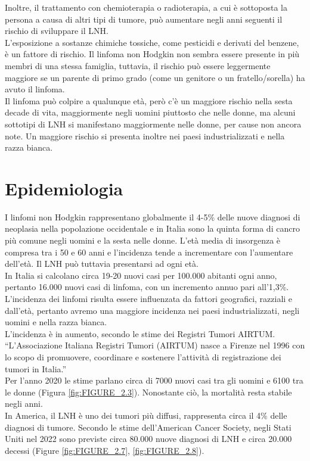 Inoltre, il trattamento con chemioterapia o radioterapia, a cui è sottoposta la persona a causa di altri tipi di tumore, 
può aumentare negli anni seguenti  il rischio di sviluppare il LNH\cite{AMERICANCS}.\\
L’esposizione a sostanze chimiche tossiche, come pesticidi e derivati del benzene, è un fattore di rischio. 
Il linfoma non Hodgkin non sembra essere presente in più membri di una stessa famiglia, tuttavia, 
il rischio può essere leggermente maggiore se un parente di primo grado (come un genitore o un fratello/sorella) 
ha avuto il linfoma\cite{AMERICANCS}.\\
Il linfoma può colpire a qualunque età, però c’è un maggiore rischio nella sesta decade di vita, 
maggiormente negli uomini piuttosto che nelle donne, ma alcuni sottotipi di LNH si manifestano 
maggiormente nelle donne, per cause non ancora note. 
Un maggiore rischio si presenta inoltre nei paesi industrializzati e nella razza bianca\cite{AMERICANCS}.\\ 

\section{Epidemiologia}
I linfomi non Hodgkin rappresentano globalmente il 4-5\% delle nuove diagnosi di neoplasia nella popolazione 
occidentale e in Italia 
sono la quinta forma di cancro più comune negli uomini e la sesta nelle donne\cite{AIOM}. 
L’età media di insorgenza è compresa tra i 50 e 60 anni e l’incidenza tende a incrementare con l’aumentare dell’età. 
Il LNH può tuttavia presentarsi ad ogni età.\\ 
In Italia si calcolano circa 19-20 nuovi casi per 100.000 abitanti ogni anno, pertanto 16.000 nuovi casi di linfoma, 
con un incremento annuo pari all’1,3\%\cite{AIOM}.\\
L’incidenza dei linfomi risulta essere influenzata da fattori geografici, razziali e dall'età, 
pertanto avremo una maggiore incidenza nei paesi industrializzati, negli uomini e nella razza bianca\cite{AIOM}.\\
L’incidenza è in aumento, secondo le stime dei Registri Tumori AIRTUM. “L’Associazione Italiana Registri Tumori 
(AIRTUM) nasce a Firenze nel 1996 con lo scopo di promuovere, coordinare e sostenere l’attività di registrazione 
dei tumori in Italia\cite{AIRTUM}.”\\
Per l’anno 2020 le stime parlano circa di 7000 nuovi casi tra gli uomini e 6100 tra le donne (Figura \ref{fig:FIGURE_2.3}). 
Nonostante ciò, la mortalità resta stabile negli anni\cite{AIRC}.\\
In America, il LNH è uno dei tumori più diffusi, rappresenta circa il 4\% delle diagnosi di tumore. 
Secondo le stime dell’American Cancer Society, negli Stati Uniti nel 2022 sono previste circa 80.000 nuove 
diagnosi di LNH e circa 20.000 decessi (Figure \ref{fig:FIGURE_2.7}, \ref{fig:FIGURE_2.8})\cite{Americanstatistic}.\\

